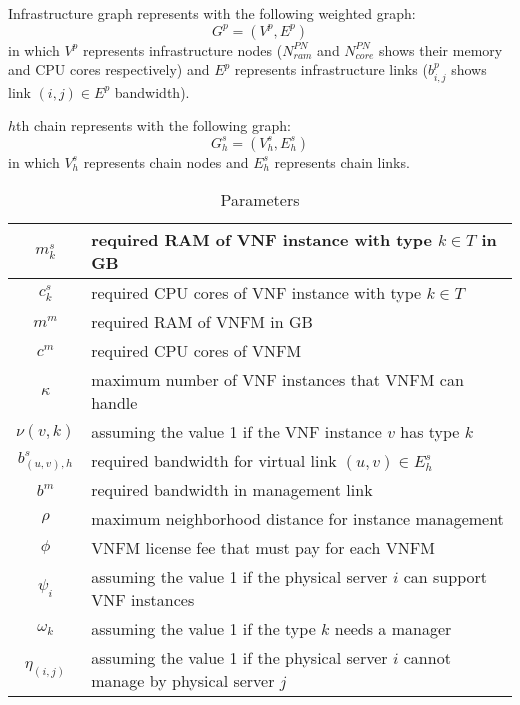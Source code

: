\par
Infrastructure graph represents with the following weighted graph:
\[
G^p = (V^p,E^p)
\]
in which
\(V^p\) represents infrastructure nodes (\(N_{ram}^{PN}\) and \(N_{core}^{PN}\) shows their memory and CPU cores respectively) and
\(E^p\) represents infrastructure links (\(b^p_{i,j}\) shows link \((i, j) \in E^p\) bandwidth).

\par
\(h\)th chain represents with the following graph:
\[
G^s_h = (V^s_h, E^s_h)
\]
in which
\(V^s_{h}\) represents chain nodes and
\(E^s_{h}\) represents chain links.

\begin{table}[H]
    \caption{Parameters}
    \label{tbl:parameters}
    \begin{center}\begin{tabular}{|c|p{}|}
    \hline
    \(m^s_k\) & required RAM of VNF instance with type \(k \in T\) in GB \\
    \hline
    \(c^s_k\) & required CPU cores of VNF instance with type \(k \in T\) \\
    \hline
    \(m^m\) & required RAM of VNFM in GB \\
    \hline
    \(c^m\) & required CPU cores of VNFM \\
    \hline
    \(\kappa\) & maximum number of VNF instances that VNFM can handle \\
    \hline
    \(\nu(v, k)\) & assuming the value 1 if the VNF instance \(v\) has type \(k\)  \\
    \hline
    \(b^s_{(u, v),h}\) & required bandwidth for virtual link \((u, v) \in E^s_h\) \\
    \hline
    \(b^m\) & required bandwidth in management link \\
    \hline
    \(\rho\) & maximum neighborhood distance for instance management \\
    \hline
    \(\phi\) & VNFM license fee that must pay for each VNFM \\
    \hline
    \(\psi_i\) & assuming the value 1 if the physical server \(i\) can support VNF instances \\
    \hline
    \(\omega_k\) & assuming the value 1 if the type \(k\) needs a manager \\
    \hline
    \(\eta_{(i, j)}\) & assuming the value 1 if the physical server \(i\) cannot manage by physical server \(j\) \\
    \hline
    \end{tabular}\end{center}
\end{table}

